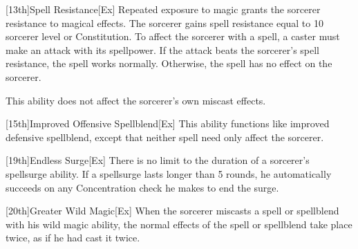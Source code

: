 [13th]{Spell Resistance}[Ex]
Repeated exposure to magic grants the sorcerer resistance to magical effects.
The sorcerer gains spell resistance equal to 10 \add sorcerer level or Constitution.
To affect the sorcerer with a spell, a caster must make an attack with its spellpower.
If the attack beats the sorcerer's spell resistance, the spell works normally.
Otherwise, the spell has no effect on the sorcerer.

This ability does not affect the sorcerer's own miscast effects.

[15th]{Improved Offensive Spellblend}[Ex]
This ability functions like improved defensive spellblend, except that neither spell need only affect the sorcerer.

[19th]{Endless Surge}[Ex]
There is no limit to the duration of a sorcerer's spellsurge ability.
If a spellsurge lasts longer than 5 rounds, he automatically succeeds on any Concentration check he makes to end the surge.

[20th]{Greater Wild Magic}[Ex]
When the sorcerer miscasts a spell or spellblend with his wild magic ability, the normal effects of the spell or spellblend take place twice, as if he had cast it twice.

